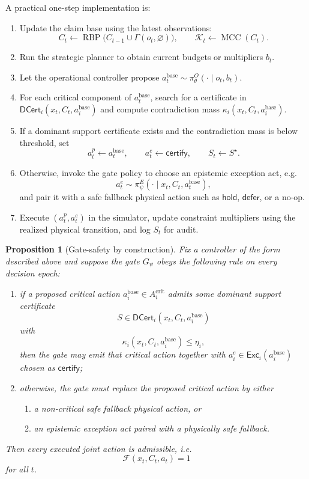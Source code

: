 \documentclass[11pt]{article}
\newcommand{\RBP}{\operatorname{RBP}}
\newcommand{\MCC}{\operatorname{MCC}}
\newcommand{\DCert}{\mathsf{DCert}}
\newcommand{\Exc}{\mathsf{Exc}}
\newcommand{\1}{\mathbf{1}}
\theoremstyle{definition}
\theoremstyle{plain}
\newtheorem{proposition}[definition]{Proposition}
\theoremstyle{remark}
\begin{document}
A practical one-step implementation is:
\begin{enumerate}[leftmargin=1.7em,label=\arabic*.]
\item Update the claim base using the latest observations:
\[
C_t \leftarrow \RBP\big(C_{t-1}\cup \Gamma(o_t,\varnothing)\big),
\qquad
\mathcal K_t\leftarrow \MCC(C_t).
\]
\item Run the strategic planner to obtain current budgets or multipliers $b_t$.
\item Let the operational controller propose $a_t^{\mathrm{base}}\sim \pi^{O}_{\theta}(\cdot\mid o_t,b_t)$.
\item For each critical component of $a_t^{\mathrm{base}}$, search for a certificate in $\DCert_i(x_t,C_t,a_i^{\mathrm{base}})$ and compute contradiction mass $\kappa_i(x_t,C_t,a_i^{\mathrm{base}})$.
\item If a dominant support certificate exists and the contradiction mass is below threshold, set
\[
a_t^p\leftarrow a_t^{\mathrm{base}},
\qquad
a_t^e\leftarrow \mathsf{certify},
\qquad
S_t\leftarrow S^{\star}.
\]
\item Otherwise, invoke the gate policy to choose an epistemic exception act, e.g.
\[
a_t^e\sim \pi^{E}_{\psi}(\cdot\mid x_t,C_t,a_t^{\mathrm{base}}),
\]
and pair it with a safe fallback physical action such as $\mathsf{hold}$, $\mathsf{defer}$, or a no-op.
\item Execute $(a_t^p,a_t^e)$ in the simulator, update constraint multipliers using the realized physical transition, and log $S_t$ for audit.
\end{enumerate}

\begin{proposition}[Gate-safety by construction]
\label{supp:prop:gate-safety}
Fix a controller of the form described above and suppose the gate $G_{\psi}$ obeys the following rule on every decision epoch:
\begin{enumerate}[leftmargin=1.6em,label=(\roman*)]
\item if a proposed critical action $a_i^{\mathrm{base}}\in A_i^{\mathrm{crit}}$ admits some dominant support certificate
\[
S\in \DCert_i(x_t,C_t,a_i^{\mathrm{base}})
\]
with
\[
\kappa_i(x_t,C_t,a_i^{\mathrm{base}})\le \eta_i,
\]
then the gate may emit that critical action together with $a_i^e\in \Exc_i(a_i^{\mathrm{base}})$ chosen as $\mathsf{certify}$;
\item otherwise, the gate must replace the proposed critical action by either
\begin{enumerate}[leftmargin=1.6em,label=(\alph*)]
\item a non-critical safe fallback physical action, or
\item an epistemic exception act paired with a physically safe fallback.
\end{enumerate}
\end{enumerate}
Then every executed joint action is admissible, i.e.
\[
\mathcal F(x_t,C_t,a_t)=1
\]
for all $t$.
\end{proposition}
\end{document}
